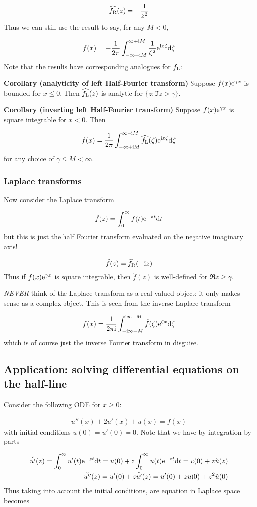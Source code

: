 \documentclass[12pt,landscape]{article}
\def\D{ {\rm d} }
\def\I{ {\rm i} }
\def\E{ {\rm e} }
\def\fR{ f_{\rm R} }
\def\fL{ f_{\rm L} }
\def\dt{\D t}
\begin{document}
{\[
\widehat{\fR}(z) = -{1 \over z^2}
\]
Thus we can still use the result to say, for any $M < 0$,

\[
f(x) =-{1 \over 2 \pi} \int_{-\infty+\I M}^{\infty +\I M} {1 \over \zeta^2} \E^{\I x \zeta}\D \zeta
\]
Note that the results have corresponding analogues for $\fL$:

\textbf{Corollary (analyticity of left Half-Fourier transform)} Suppose $f(x) \E^{\gamma x}$  is bounded for $x \leq 0$. Then $\widehat{\fL}(z)$ is analytic for $\{z : \Im z > \gamma \}$.

\textbf{Corollary  (inverting left Half-Fourier transform)} Suppose $f(x) \E^{\gamma x}$ is square integrable for $x < 0$. Then

\[
f(x) = {1 \over 2 \pi} \int_{-\infty + \I M}^{\infty + \I M} \widehat{\fL}(\zeta) \E^{\I x \zeta} \D \zeta
\]
for any choice of $\gamma \leq M < \infty$.

\subsubsection{Laplace transforms}
Now consider the Laplace transform

\[
\check f(z) = \int_0^\infty f(t) \E^{-z t} \dt
\]
but this is just the half Fourier transform evaluated on the negative imaginary axis!

\[
\check f(z) = \widehat\fR (-\I z)
\]
Thus if $f(x) \E^{\gamma x}$ is square integrable, then $\check f(z)$ is well-defined for $\Re z \geq \gamma$.

\emph{NEVER} think of the Laplace transform as a real-valued object: it only makes sense as a complex object. This is seen from the inverse Laplace transform

\[
f(x) = {1 \over 2 \pi \I} \int_{-\I \infty - M}^{\I \infty - M}  \check f(\zeta) \E^{\zeta x} \D \zeta
\]
which is of course just the inverse Fourier transform in disguise.

\subsection{Application: solving differential equations on the half-line}
Consider the following ODE for $x \geq 0$:


\begin{align*}
u''(x) + 2u'(x) + u(x) = f(x)
\end{align*}
with initial conditions $u(0) = u'(0) = 0$. Note that we have by integration-by-parts


\begin{align*}
\check{u'}(z) = \int_0^\infty u'(t) \E^{-z t} \dt = u(0) + z \int_0^\infty u(t) \E^{-z t} \dt = u(0) + z \check u(z) \\
\check{u''}(z) = u'(0) + z \check{u'}(z) = u'(0) + z u(0) + z^2 \check u(0)
\end{align*}
Thus taking into account the initial conditions, are equation in Laplace space becomes

}
\end{document}
